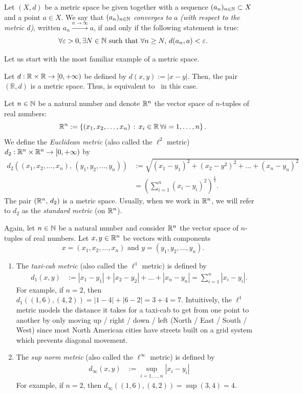 \begin{defn}
	\label{defn:cvg_metric}
Let $(X,d)$ be a metric space be given together with a sequence $(a_n)_{n\in\mathbb{N}}\subset X$ and a point $a\in X$. We say that $(a_n)_{n\in\mathbb{N}}$ \textit{converges to }$a$ \textit{(with respect to the metric $d$)}, written $a_n\overset{n\to \infty}{\to} a$, if and only if the following statement is true:
\[
\forall \varepsilon>0,\exists N\in\mathbb{N}\text{ such that }\forall n\ge N, \, d(a_n,a)<\varepsilon.
\]
\end{defn}
Let us start with the most familiar example of a metric space.
\begin{eg}
\label{eg:real_metric}
Let $d:\mathbb{R}\times\mathbb{R}\to [0,+\infty)$ be defined by $d(x,y) := |x-y|$. Then, the pair $(\mathbb{R}, d)$ is a metric space. Thus,  is equivalent to~ in this case.
\end{eg}
\begin{eg}
Let $n\in\mathbb{N}$ be a natural number and denote $\mathbb{R}^n$ the vector space of $n$-tuples of real numbers:
\[
\mathbb{R}^n := \left\{
(x_1,x_2,\dots, x_n)\, : \, x_i\in\mathbb{R} \, \forall i=1,\dots, n
\right\}.
\]
We define the \textit{Euclidean metric} (also called the $\ell^2$ metric) $d_2:\mathbb{R}^n\times \mathbb{R}^n\to [0,+\infty)$ by
\begin{align*}
d_2((x_1,x_2,\dots, x_n),\,(y_1,y_2,\dots, y_n))&:= \sqrt{(x_1-y_1)^2 + (x_2-y^2)^2 + \dots + (x_n-y_n)^2} 	\\
&= \left(\sum_{i=1}^n (x_i-y_i)^2\right)^\frac{1}{2}.
\end{align*}
The pair $(\mathbb{R}^n,\, d_2)$ is a metric space. Usually, when we work in $\mathbb{R}^n$, we will refer to $d_2$ as the \textit{standard metric} (on $\mathbb{R}^n$).
\end{eg}
\begin{eg}
Again, let $n\in\mathbb{N}$ be a natural number and consider $\mathbb{R}^n$ the vector space of $n$-tuples of real numbers. Let $x,y\in\mathbb{R}^n$ be vectors with components
\[
x=(x_1,x_2,\dots, x_n)\text{ and }y = (y_1,y_2,\dots, y_n).
\]
\begin{enumerate}
	\item The \textit{taxi-cab metric} (also called the $\ell^1$ metric) is defined by
	\begin{align*}
	d_1(x,y) 	&:= |x_1-y_1| + |x_2-y_2| + \dots + |x_n - y_n| = \sum_{i=1}^n|x_i-y_i|.
	\end{align*}
	For example, if $n=2$, then $d_1((1,6),(4,2)) = |1 - 4| + |6 - 2| = 3 + 4 = 7$. Intuitively, the $\ell^1$ metric models the distance it takes for a taxi-cab to get from one point to another by only moving up / right / down / left (North / East / South / West) since most North American cities have streets built on a grid system which prevents diagonal movement.
	\item The \textit{sup norm metric} (also called the $\ell^\infty$ metric) is defined by
	\begin{align*}
		d_\infty(x,y) 	&:= \sup_{i=1,\dots, n}|x_i-y_i|
	\end{align*}
	For example, if $n=2$, then $d_\infty((1,6),(4,2)) = \sup (3,4) = 4$.
\end{enumerate}
\end{eg}
